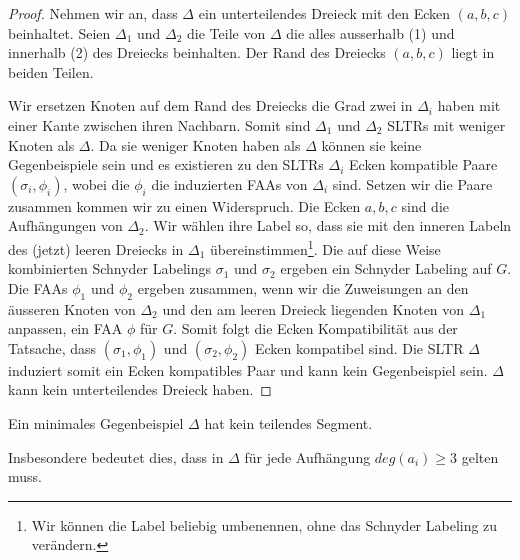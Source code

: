 \begin{proof}
Nehmen wir an, dass $\Delta$ ein unterteilendes Dreieck mit den Ecken $(a,b,c)$ beinhaltet. Seien $\Delta_1$ und $\Delta_2$ die Teile von $\Delta$ die alles ausserhalb (1) und innerhalb (2) des Dreiecks beinhalten. Der Rand des Dreiecks $(a,b,c)$ liegt in beiden Teilen.

Wir ersetzen Knoten auf dem Rand des Dreiecks die Grad zwei in $\Delta_i$ haben mit einer Kante zwischen ihren Nachbarn. Somit sind $\Delta_1$ und $\Delta_2$ SLTRs mit weniger Knoten als $\Delta$. Da sie weniger Knoten haben als $\Delta$ können sie keine Gegenbeispiele sein und es existieren zu den SLTRs $\Delta_i$ Ecken kompatible Paare $(\sigma_i,\phi_i)$, wobei die $\phi_i$ die induzierten FAAs von $\Delta_i$ sind. Setzen wir die Paare zusammen kommen wir zu einen Widerspruch. Die Ecken $a,b,c$ sind die Aufhängungen von $\Delta_2$. Wir wählen ihre Label so, dass sie mit den inneren Labeln des (jetzt) leeren Dreiecks in $\Delta_1$ übereinstimmen\footnote{Wir können die Label beliebig umbenennen, ohne das Schnyder Labeling zu verändern.}. Die auf diese Weise kombinierten Schnyder Labelings $\sigma_1$ und $\sigma_2$ ergeben ein Schnyder Labeling auf $G$. Die FAAs $\phi_1$ und $\phi_2$ ergeben zusammen, wenn wir die Zuweisungen an den äusseren Knoten von $\Delta_2$ und den am leeren Dreieck liegenden Knoten von $\Delta_1$ anpassen, ein FAA $\phi$ für $G$. Somit folgt die Ecken Kompatibilität aus der Tatsache, dass $(\sigma_1,\phi_1)$ und $(\sigma_2,\phi_2)$ Ecken kompatibel sind. Die SLTR $\Delta$ induziert somit ein Ecken kompatibles Paar und kann kein Gegenbeispiel sein. $\Delta$ kann kein unterteilendes Dreieck haben.
\end{proof} 

\begin{lemma}\label{lem3}
Ein minimales Gegenbeispiel $\Delta$ hat kein teilendes Segment.
\end{lemma}

\begin{remark}
Insbesondere bedeutet dies, dass in $\Delta$ für jede Aufhängung $deg(a_i) \geq 3$ gelten muss.
\end{remark}

